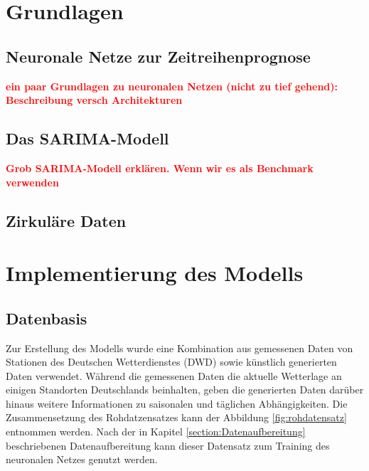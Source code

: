 \documentclass[
12pt, %
toc=listofnumbered, %
toc=chapterentrydotfill, %
numbers=noenddot, %
captions=tableheading, %
bibliography=numbered
]{scrreprt}
\let\Oldsection\section
\renewcommand{\section}{\FloatBarrier\Oldsection}
\newcommand{\highlight}[1]{\textbf{\textcolor{red}{#1}}}
\begin{document}
\chapter{Grundlagen}

\section{Neuronale Netze zur Zeitreihenprognose}
\highlight{ein paar Grundlagen zu neuronalen Netzen (nicht zu tief gehend): 
Beschreibung versch Architekturen}

\section{Das SARIMA-Modell}
\highlight{Grob SARIMA-Modell erklären. Wenn wir es als Benchmark verwenden}

\section{Zirkuläre Daten}\label{section:circ_data}


\chapter{Implementierung des Modells}

\section{Datenbasis}
Zur Erstellung des Modells wurde eine Kombination aus gemessenen Daten von Stationen des Deutschen Wetterdienstes (DWD) sowie künstlich generierten Daten verwendet.
Während die gemessenen Daten die aktuelle Wetterlage an einigen Standorten Deutschlands beinhalten, geben die generierten Daten darüber hinaus weitere Informationen zu saisonalen und täglichen Abhängigkeiten. Die Zusammensetzung des Rohdatzensatzes kann der Abbildung \ref{fig:rohdatensatz} entnommen werden. Nach der in Kapitel \ref{section:Datenaufbereitung} beschriebenen Datenaufbereitung kann dieser Datensatz zum Training des neuronalen Netzes genutzt werden.
\end{document}
